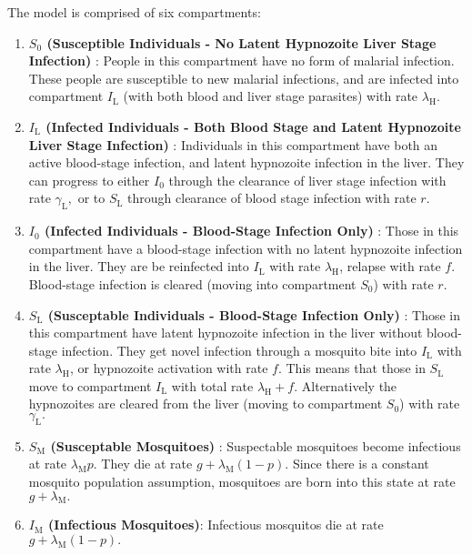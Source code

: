 The model is comprised of six compartments: \begin{enumerate}
    \item \textbf{
              $S_0$ (Susceptible Individuals - No Latent Hypnozoite Liver
              Stage Infection)
          }: People in this compartment have no form of malarial infection.
          These people are susceptible to new malarial infections,
          and are infected into compartment $I_\mathrm{L}$ (with both blood
          and liver stage parasites) with rate $\lambda_\mathrm{H}$.
    \item \textbf{
              $I_\mathrm{L}$ (Infected Individuals - Both Blood Stage and Latent
              Hypnozoite Liver Stage Infection)
          }:  Individuals in this compartment have both an active blood-stage
          infection, and latent hypnozoite infection in the liver. They can
          progress to either $I_0$ through the clearance of liver stage
          infection with rate $\gamma_\mathrm{L},$ or to $S_\mathrm{L}$ through
          clearance of blood stage infection with rate $r$.
    \item \textbf{
              $I_0$ (Infected Individuals - Blood-Stage Infection Only)
          }: Those in this compartment have a blood-stage infection with no
          latent hypnozoite infection in the liver. They are be reinfected into
          $I_\mathrm{L}$ with rate $\lambda_\mathrm{H}$, relapse with rate $f$.
          Blood-stage infection is cleared (moving into compartment $S_0$) with
          rate $r$.
    \item \textbf{
              $S_\mathrm{L}$ (Susceptable Individuals -
              Blood-Stage Infection Only)
          }: Those in this compartment have latent hypnozoite infection in
          the liver without blood-stage infection. They get novel infection
          through a mosquito bite into $I_\mathrm{L}$ with rate
          $\lambda_\mathrm{H}$, or hypnozoite activation with rate $f$.
          This means that those in $S_\mathrm{L}$ move to compartment
          $I_\mathrm{L}$ with total rate $\lambda_\mathrm{H} + f.$
          Alternatively the hypnozoites are cleared from the liver
          (moving to compartment $S_0$) with rate $\gamma_\mathrm{L}.$
    \item \textbf{
              $S_\mathrm{M}$ (Susceptable Mosquitoes)
          }:
          Suspectable mosquitoes become infectious at rate
          $\lambda_\mathrm{M}p.$ They die at rate
          $g + \lambda_\mathrm{M}(1 - p).$ Since there is a constant mosquito
          population assumption, mosquitoes are born into this state at rate
          $g + \lambda_\mathrm{M}.$
    \item \textbf{$I_\mathrm{M}$ (Infectious Mosquitoes)}:
          Infectious mosquitos die at rate $g + \lambda_\mathrm{M}(1 - p).$
\end{enumerate}

